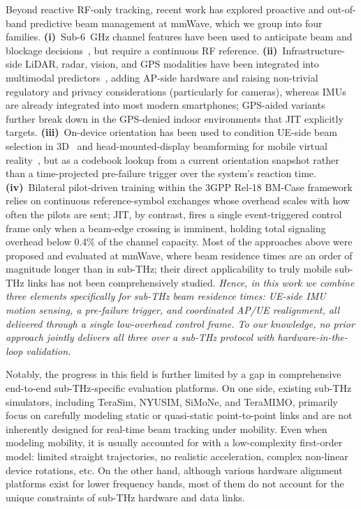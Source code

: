 \documentclass[fleqn,10pt]{wlscirep}
\newcommand{\rev}[1]{{\color{revblue}#1}}
\begin{document}
\rev{Beyond reactive RF-only tracking, recent work has explored proactive and out-of-band predictive beam management at mmWave, which we group into four families. \textbf{(i)}~Sub-6~GHz channel features have been used to anticipate beam and blockage decisions~\cite{Alrabeiah2020DeepLearning}, but require a continuous RF reference. \textbf{(ii)}~Infrastructure-side LiDAR, radar, vision, and GPS modalities have been integrated into multimodal predictors~\cite{Alkhateeb2023DeepSense, Jiang2023LiDAR, Morais2023Position}, adding AP-side hardware and raising non-trivial regulatory and privacy considerations (particularly for cameras), whereas IMUs are already integrated into most modern smartphones; GPS-aided variants further break down in the GPS-denied indoor environments that JIT explicitly targets. \textbf{(iii)}~On-device orientation has been used to condition UE-side beam selection in 3D~\cite{Rezaie2022Orientation} and head-mounted-display beamforming for mobile virtual reality~\cite{Struye2023CoVRage}, but as a codebook lookup from a current orientation snapshot rather than a time-projected pre-failure trigger over the system's reaction time. \textbf{(iv)}~Bilateral pilot-driven training within the 3GPP Rel-18 BM-Case framework~\cite{Alkhateeb2018DLCB, Xue2023Standardization, Heng2021SixChallenges} relies on continuous reference-symbol exchanges whose overhead scales with how often the pilots are sent; JIT, by contrast, fires a single event-triggered control frame only when a beam-edge crossing is imminent, holding total signaling overhead below 0.4\% of the channel capacity. Most of the approaches above were proposed and evaluated at mmWave, where beam residence times are an order of magnitude longer than in sub-THz; their direct applicability to truly mobile sub-THz links has not been comprehensively studied. \emph{Hence, in this work we combine three elements specifically for sub-THz beam residence times: UE-side IMU motion sensing, a pre-failure trigger, and coordinated AP/UE realignment, all delivered through a single low-overhead control frame. To our knowledge, no prior approach jointly delivers all three over a sub-THz protocol with hardware-in-the-loop validation.}}

Notably, the progress in this field is further limited by a gap in comprehensive end-to-end sub-THz-specific evaluation platforms. On one side, existing sub-THz simulators, including TeraSim\cite{HOSSAIN2019100004}, NYUSIM\cite{10367974}, SiMoNe\cite{rose2015simone, eckhardt2022modular}, and TeraMIMO\cite{tarboush2021teramimo, bodet2023directional}, primarily focus on carefully modeling static or quasi-static point-to-point links and are not inherently designed for real-time beam tracking under mobility\cite{Petrov2023Mobile}. Even when modeling mobility, it is usually accounted for with a low-complexity first-order model: limited straight trajectories, no realistic acceleration, complex non-linear device rotations, etc. On the other hand, although various hardware alignment platforms exist for lower frequency bands\cite{Abdulwahab2020, Keshavamurthy2022, AlAkkoumi2008}, most of them do not account for the unique constraints of sub-THz hardware and data links.
\end{document}

